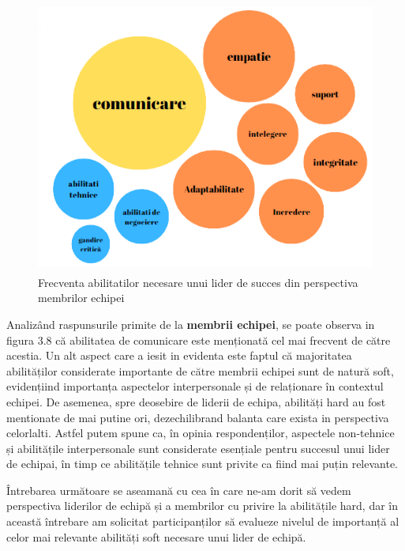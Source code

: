 \documentclass[a4paper, 12pt]{article}
\begin{document}
\begin{enumerate}[A)]
\begin{figure}[!htb]
			\centering
			\includegraphics[width=14cm, height=9cm]{"figures/team members succes.png"}
			\caption {Frecventa abilitatilor necesare unui lider de succes din perspectiva membrilor echipei}\label{fig:four}
	
		\end{figure}

	\quad Analizând raspunsurile primite de la \textbf{membrii echipei}, se poate observa in figura 3.8 că abilitatea de comunicare este menționată cel mai frecvent de către acestia. Un alt  aspect care a iesit in evidenta este faptul că majoritatea abilităților considerate importante de către membrii echipei sunt de natură soft, evidențiind importanța aspectelor interpersonale și de relaționare în contextul echipei. De asemenea, spre deosebire de liderii de echipa, abilități hard au fost mentionate de mai putine ori, dezechilibrand balanta care exista in perspectiva celorlalti. Astfel putem spune ca, în opinia respondenților, aspectele non-tehnice și abilitățile interpersonale sunt considerate esențiale pentru succesul unui lider de echipai, în timp ce abilitățile tehnice sunt privite ca fiind mai puțin relevante.


	\quad Întrebarea următoare se aseamană cu cea în care ne-am dorit să vedem perspectiva liderilor de echipă și a membrilor cu privire la abilitățile hard, dar în această întrebare am solicitat participanților să evalueze nivelul de importanță al celor mai relevante abilități soft necesare unui lider de echipă.



\end{enumerate}
\end{document}
